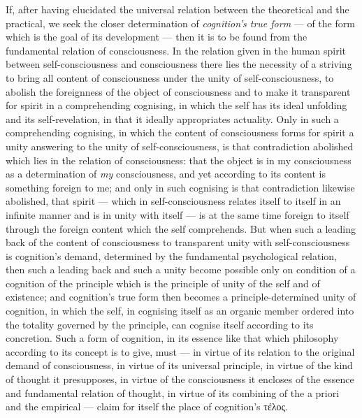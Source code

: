 \documentclass[12pt,a4paper]{book}
\begin{document}
If, after having elucidated the universal relation between the theoretical and
the practical, we seek the closer determination of \emph{cognition's true
form} --- of the form which is the goal of its development --- then it is to
be found from the fundamental relation of consciousness. In the relation given
in the human spirit between self-consciousness and consciousness there lies
the necessity of a striving to bring all content of consciousness under the
unity of self-consciousness, to abolish the foreignness of the object of
consciousness and to make it transparent for spirit in a comprehending
cognising, in which the self has its ideal unfolding and its self-revelation,
in that it ideally appropriates actuality. Only in such a comprehending
cognising, in which the content of consciousness forms for spirit a unity
answering to the unity of self-consciousness, is that contradiction abolished
which lies in the relation of consciousness: that the object is in my
consciousness as a determination of \emph{my} consciousness, and yet
according to its content is something foreign to me; and only in such
cognising is that contradiction likewise abolished, that spirit --- which in
self-consciousness relates itself to itself in an infinite manner and is in
unity with itself --- is at the same time foreign to itself through the
foreign content which the self comprehends.
But when such a leading back of the content of consciousness to transparent
unity with self-consciousness is cognition's demand, determined by the
fundamental psychological relation, then such a leading back and such a unity
become possible only on condition of a cognition of the principle which is the
principle of unity of the self and of existence; and cognition's true form
then becomes a principle-determined unity of cognition, in which the self, in
cognising itself as an organic member ordered into the totality governed by
the principle, can cognise itself according to its concretion. Such a form of
cognition, in its essence like that which philosophy according to its concept
is to give, must --- in virtue of its relation to the original demand of
consciousness, in virtue of its universal principle, in virtue of the kind of
thought it presupposes, in virtue of the consciousness it encloses of the
essence and fundamental relation of thought, in virtue of its combining of the
a priori and the empirical --- claim for itself the place of cognition's
τέλος.
\end{document}
